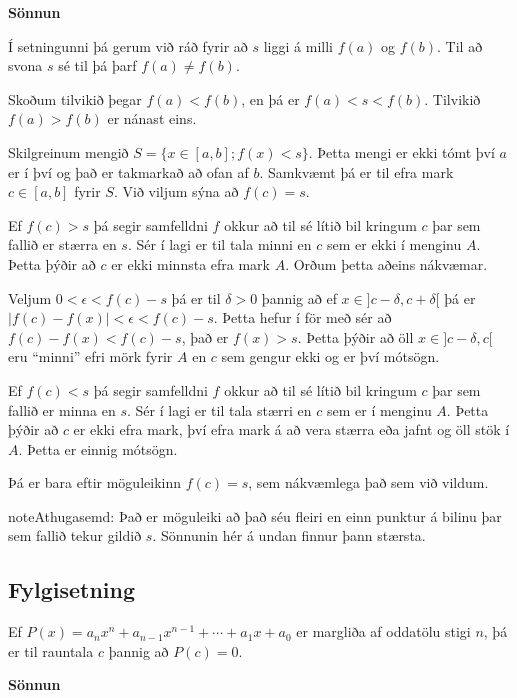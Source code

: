 \documentclass[a4paper,10pt,icelandic]{sphinxmanual}
\begin{document}
\textbf{Sönnun}

Í setningunni þá gerum við ráð fyrir að \(s\) liggi á milli \(f(a)\) og
\(f(b)\). Til að svona \(s\) sé til þá þarf \(f(a) \neq f(b)\).

Skoðum tilvikið þegar \(f(a) < f(b)\), en þá er \(f(a) < s < f(b)\).
Tilvikið \(f(a)>f(b)\) er nánast eins.

Skilgreinum mengið \(S = \{ x \in [a,b] ; f(x) < s\}\). Þetta mengi er ekki tómt
því \(a\) er í því og það er takmarkað að ofan af \(b\). Samkvæmt
{\hyperref[kafli01:frumsendanumeframark]{}} þá er til efra mark \(c \in[a,b]\)
fyrir \(S\). Við viljum sýna að \(f(c)=s\).

Ef \(f(c)>s\) þá segir samfelldni \(f\)
okkur að til sé lítið bil kringum \(c\) þar sem fallið er stærra en \(s\). Sér í lagi er
til tala minni en \(c\) sem er ekki í menginu \(A\). Þetta þýðir að \(c\) er
ekki minnsta efra mark \(A\). Orðum þetta aðeins nákvæmar.

Veljum \(0<\epsilon < f(c)-s\) þá er til \(\delta>0\) þannig að ef \(x\in ]c-\delta,c+\delta[\)
þá er \(|f(c)-f(x)|<\epsilon < f(c) -s\). Þetta hefur í för með sér að \(f(c) - f(x) < f(c) -s\),
það er \(f(x)>s\). Þetta þýðir að öll \(x\in]c-\delta,c[\) eru ``minni'' efri mörk fyrir \(A\)
en \(c\) sem gengur ekki og er því mótsögn.

Ef \(f(c)<s\) þá segir samfelldni \(f\) okkur að til sé lítið bil kringum \(c\)
þar sem fallið er minna en \(s\). Sér í lagi  er til tala stærri en \(c\) sem er í menginu
\(A\). Þetta þýðir að \(c\) er ekki efra mark, því efra mark á að vera stærra eða jafnt
og öll stök í \(A\). Þetta er einnig mótsögn.

Þá er bara eftir möguleikinn \(f(c)=s\), sem nákvæmlega það sem við vildum.

\begin{notice}{note}{Athugasemd:}
Það er möguleiki að það séu fleiri en einn punktur á bilinu þar sem fallið tekur
gildið \(s\). Sönnunin hér á undan finnur þann stærsta.
\end{notice}


\subsection{Fylgisetning}
\label{kafli02:fylgisetning}
Ef \(P(x)=a_nx^n+a_{n-1}x^{n-1}+\cdots+a_1x+a_0\) er margliða af
oddatölu stigi \(n\), þá er til rauntala \(c\) þannig að \(P(c)=0\).

\textbf{Sönnun}
\end{document}
